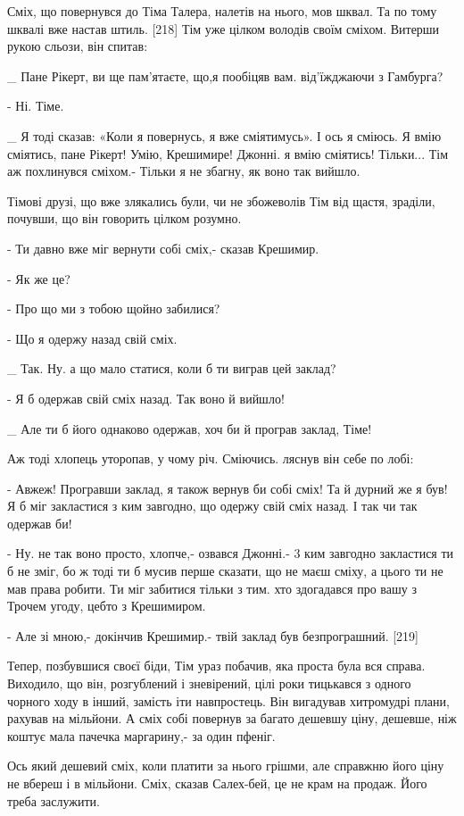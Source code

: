 Сміх, що повернувся до Тіма Талера, налетів на нього, мов шквал. Та по тому шквалі вже настав штиль. [218] Тім уже цілком володів своїм сміхом. Витерши рукою сльози, він спитав:

_ Пане Рікерт, ви ще пам'ятаєте, що,я пообіцяв вам. від'їжджаючи з Гамбурга?

- Ні. Тіме.

_ Я тоді сказав: «Коли я повернусь, я вже сміятимусь». І ось я сміюсь. Я вмію сміятись, пане Рікерт! Умію, Крешимире! Джонні. я вмію сміятись! Тільки... Тім аж похлинувся сміхом.- Тільки я не збагну, як воно так вийшло.

Тімові друзі, що вже злякались були, чи не збожеволів Тім від щастя, зраділи, почувши, що він говорить цілком розумно.

- Ти давно вже міг вернути собі сміх,- сказав Крешимир.

- Як же це?

- Про що ми з тобою щойно забилися?

- Що я одержу назад свій сміх.

_ Так. Ну. а що мало статися, коли б ти виграв цей заклад?

- Я б одержав свій сміх назад. Так воно й вийшло!

_ Але ти б його однаково одержав, хоч би й програв заклад, Тіме!

Аж тоді хлопець уторопав, у чому річ. Сміючись. ляснув він себе по лобі:

- Авжеж! Програвши заклад, я також вернув би собі сміх! Та й дурний же я був! Я б міг закластися з ким завгодно, що одержу свій сміх назад. І так чи так одержав би!

- Ну. не так воно просто, хлопче,- озвався Джонні.- 3 ким завгодно закластися ти б не зміг, бо ж тоді ти б мусив перше сказати, що не маєш сміху, а цього ти не мав права робити. Ти міг забитися тільки з тим. хто здогадався про вашу з Трочем угоду, цебто з Крешимиром.

- Але зі мною,- докінчив Крешимир.- твій заклад був безпрограшний. [219]

Тепер, позбувшися своєї біди, Тім ураз побачив, яка проста була вся справа. Виходило, що він, розгублений і зневірений, цілі роки тицькався з одного чорного ходу в інший, замість іти навпростець. Він вигадував хитромудрі плани, рахував на мільйони. А сміх собі повернув за багато дешевшу ціну, дешевше, ніж коштує мала пачечка маргарину,- за один пфеніг.

Ось який дешевий сміх, коли платити за нього грішми, але справжню його ціну не вбереш і в мільйони. Сміх, сказав Салех-бей, це не крам на продаж. Його треба заслужити.

